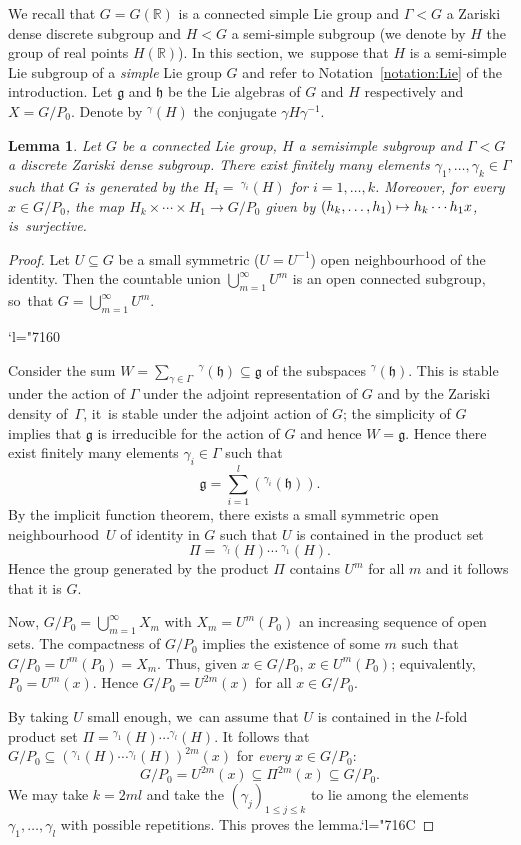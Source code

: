 \documentclass[JEP,XML,SOM,Unicode,published]{cedram}
\newcommand{\Changel}{\mathcode`l="7160}
\newcommand{\Changelback}{\mathcode`l="716C}
\def\mto{\mathchoice{\longmapsto}{\mapsto}{\mapsto}{\mapsto}}
\newtheorem{lemma}{Lemma}
\theoremstyle{definition}
\newcommand{\field}[1]{\mathbb{#1}}
\newcommand{\R}{\field{R}}
\let\g\gamma
\let\G\Gamma
\newcommand{\frg}{\mathfrak g}
\newcommand{\fh}{\mathfrak h}
\begin{document}
We recall that $G=G(\R)$ is a connected simple Lie group and $\G< G$ a Zariski dense discrete subgroup and $H<G$ a semi-simple subgroup (we denote by $H$ the group of real points $H(\R)$). In this section, we~suppose that $H$ is a semi-simple Lie subgroup of a \emph{simple} Lie group $G$ and refer to Notation~\ref{notation:Lie} of the introduction.
Let $\frg$ and $\fh$ be the Lie algebras of $G$ and $H$ respectively and $X=G/P_0$. Denote by $^{\g}(H)$ the conjugate $\g H \g ^{-1}$.

\begin{lemma} \label{G/Pgenerators} Let $G$ be a connected Lie group, $H$ a semisimple subgroup and $\Gamma<G$ a discrete Zariski dense subgroup. There exist finitely many elements $\g_1,\dots, \g_k \in \G$ such that $G$ is generated by the $H_i=\!{\ }^{\g_i}(H)$ for $i=1,\dots,k$. Moreover, for \emph{every} $x\in G/P_0$, the map $H_k\times \cdots \times H_1 \to G/P_0$ given by $(h_k,\dots,h_1)\mto h_k\cdots h_1x$, is~surjective.
\end{lemma}

\begin{proof} Let $U\subseteq G$ be a small symmetric (\ie $U=U^{-1}$) open neighbourhood of the identity. Then the countable union $\bigcup_{m=1}^{\infty} U^m$ is an open connected subgroup, so~that $G=\bigcup_{m=1}^{\infty} U^m$.

\Changel

Consider the sum $W=\sum_{\g \in \G} {\ }^{\g }(\fh) \subseteq \frg$ of the subspaces $^{\g}(\fh)$. This is stable under the action of $\G$ under the adjoint representation of $G$ and by the Zariski density of~$\G$, it~is stable under the adjoint action of $G$; the simplicity of $G$ implies that $\frg$ is irreducible for the action of $G$ and hence $W=\frg$. Hence there exist finitely many elements $\g_i \in \G$ such that
\[
\frg=\sum_{i=1}^l (^{\g_i}(\fh)).
\]
By the implicit function theorem, there exists a small symmetric open neighbourhood~$U$ of identity in $G$ such that $U$ is contained in the product set
\[
\Pi={\ }^{\g_l}(H)\cdots {\ }^{\g_1}(H).
\]
Hence the group generated by the product $\Pi$ contains $U^m$ for all $m$ and it follows that it is $G$.

Now, $G/P_0=\bigcup_{m=1}^{\infty} X_m$ with $X_m=U^m(P_0)$ an increasing sequence of open sets. The compactness of $G/P_0$ implies the existence of some $m$ such that $G/P_0=U^m(P_0)=X_m$. Thus, given $x\in G/P_0$, $x\in U^m(P_0)$; equivalently, $P_0=U^m(x)$. Hence $G/P_0=U^{2m}(x)$ for all $x\in G/P_0$.

By taking $U$ small enough, we~can assume that $U$ is contained in the $l$-fold product set $\Pi={}^{\g_1}(H)\cdots{} ^{\g_l}(H)$. It follows that $G/P_0 \subseteq (^{\g_1}(H)\cdots {}^{\g_l}(H))^{2m} (x)$ for \emph{every} $x\in G/P_0$:
\[
G/P_0=U^{2m}(x) \subseteq \Pi ^{2m}(x) \subseteq G/P_0.
\]
We may take $k=2ml$ and take the $(\g_j)_{1\leq j \leq k}$ to lie among the elements $\g_1,\dots, \g_l$ with possible repetitions. This proves the lemma.\Changelback
\end{proof}
\end{document}
